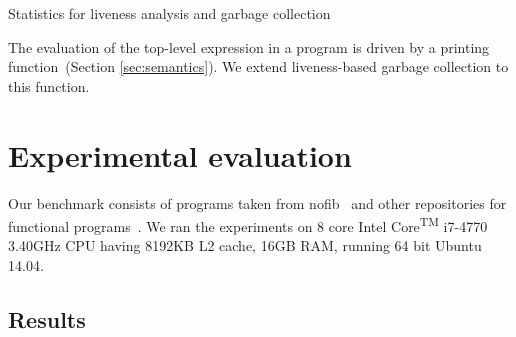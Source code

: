 \documentclass[9pt,preprint,nonatbib]{sigplanconf}
\begin{document}
\begin{table}[t!]
\caption{Statistics for liveness analysis and garbage collection}
\label{tab:exp-results}
\centering


\end{table} 

The evaluation of  the top-level expression in a program  is driven by
a printing function~(Section
\ref{sec:semantics}).  
We extend liveness-based  garbage  collection  to
this function.
\section{Experimental evaluation}
\label{sec:experiments}
Our benchmark  consists of programs taken  from nofib~\cite{nofib} and
other repositories for functional programs~\cite{PLT-Scheme, gc_bench,
  huffman-sicp}.     We    ran    the   experiments    on    8    core
Intel\textsuperscript{\textregistered}        Core\textsuperscript{TM}
i7-4770 3.40GHz CPU  having 8192KB L2 cache, 16GB RAM,  running 64 bit
Ubuntu 14.04.






\subsection{Results}
\end{document}
